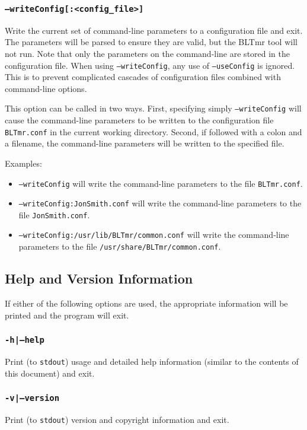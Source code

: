 \documentclass[english]{article}
\begin{document}
\subsubsection{\texttt{--writeConfig[:<config\_file>]}}
Write the current set of command-line parameters to a configuration file and 
exit. The parameters will be parsed to ensure they are valid, but the BLTmr tool
will not run.  Note that only the parameters on the command-line are stored in
the configuration file. When using \texttt{--writeConfig}, any use of
\texttt{--useConfig} is ignored. This is to prevent complicated cascades
of configuration files combined with command-line options.

This option can be called in two ways. First, specifying simply 
\texttt{--writeConfig} will cause the command-line parameters to be written to 
the configuration file \texttt{BLTmr.conf} in the current working directory. 
Second, if followed with a colon and a filename, the command-line parameters 
will be written to the specified file. 

Examples:
\begin{itemize}
  \item \texttt{--writeConfig} will write the command-line parameters to the
  file \texttt{BLTmr.conf}.
  \item \texttt{--writeConfig:JonSmith.conf} will write the command-line 
  parameters to the file \texttt{JonSmith.conf}.
  \item \texttt{--writeConfig:/usr/lib/BLTmr/common.conf} will write the
  command-line pa\-ram\-e\-ters to the file \texttt{/usr/share/BLTmr/common.conf}. 
\end{itemize}


\subsection{Help and Version Information}
If either of the following options are used, the appropriate information will be
printed and the program will exit.

\subsubsection{\texttt{-h|--help}}
Print (to \texttt{stdout}) usage and detailed help information (similar to the 
contents of this document) and exit.

\subsubsection{\texttt{-v|--version}}
Print (to \texttt{stdout}) version and copyright information and exit.
\end{document}
